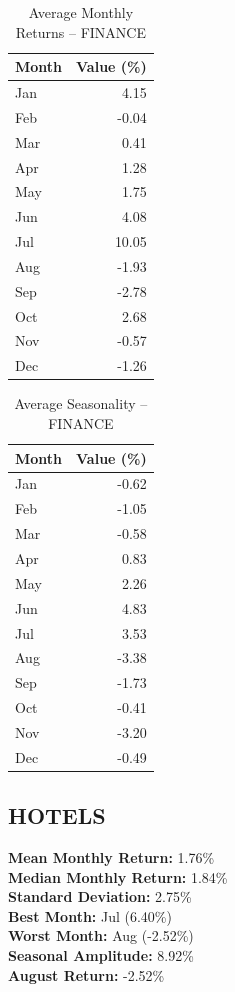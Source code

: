 \documentclass[12pt]{article}
\begin{document}
\begin{table}[h!]
\centering
\caption{Average Monthly Returns -- FINANCE}
\begin{tabular}{l r}
\toprule
Month & Value (\%) \\
\midrule
Jan & 4.15 \\
Feb & -0.04 \\
Mar & 0.41 \\
Apr & 1.28 \\
May & 1.75 \\
Jun & 4.08 \\
Jul & 10.05 \\
Aug & -1.93 \\
Sep & -2.78 \\
Oct & 2.68 \\
Nov & -0.57 \\
Dec & -1.26 \\
\bottomrule
\end{tabular}
\end{table}

\begin{table}[h!]
\centering
\caption{Average Seasonality -- FINANCE}
\begin{tabular}{l r}
\toprule
Month & Value (\%) \\
\midrule
Jan & -0.62 \\
Feb & -1.05 \\
Mar & -0.58 \\
Apr & 0.83 \\
May & 2.26 \\
Jun & 4.83 \\
Jul & 3.53 \\
Aug & -3.38 \\
Sep & -1.73 \\
Oct & -0.41 \\
Nov & -3.20 \\
Dec & -0.49 \\
\bottomrule
\end{tabular}
\end{table}


\clearpage

\subsection{HOTELS}
\textbf{Mean Monthly Return:} 1.76\% \\
\textbf{Median Monthly Return:} 1.84\% \\
\textbf{Standard Deviation:} 2.75\% \\
\textbf{Best Month:} Jul (6.40\%) \\
\textbf{Worst Month:} Aug (-2.52\%) \\
\textbf{Seasonal Amplitude:} 8.92\% \\
\textbf{August Return:} -2.52\% \\
\end{document}
